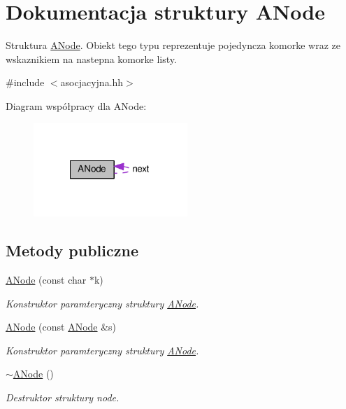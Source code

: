 \hypertarget{struct_a_node}{\section{Dokumentacja struktury A\-Node}
\label{struct_a_node}
}


Struktura \hyperlink{struct_a_node}{A\-Node}. Obiekt tego typu reprezentuje pojedyncza komorke wraz ze wskaznikiem na nastepna komorke listy.  




{\ttfamily \#include $<$asocjacyjna.\-hh$>$}



Diagram współpracy dla A\-Node\-:
\nopagebreak
\begin{figure}[H]
\begin{center}
\leavevmode
\includegraphics[width=165pt]{struct_a_node__coll__graph}
\end{center}
\end{figure}
\subsection*{Metody publiczne}
\begin{DoxyCompactItemize}
\item 
\hyperlink{struct_a_node_a932a13512cd7d15fe86c62b5292d66c1}{A\-Node} (const char $\ast$k)
\begin{DoxyCompactList}\small\item\em Konstruktor paramteryczny struktury \hyperlink{struct_a_node}{A\-Node}. \end{DoxyCompactList}\item 
\hyperlink{struct_a_node_a8f44e3ed23b669c075640f3c9976d9f5}{A\-Node} (const \hyperlink{struct_a_node}{A\-Node} \&s)
\begin{DoxyCompactList}\small\item\em Konstruktor paramteryczny struktury \hyperlink{struct_a_node}{A\-Node}. \end{DoxyCompactList}\item 
\hyperlink{struct_a_node_aec880ec60e95396aba5ffdc6ce0a4e8d}{$\sim$\-A\-Node} ()
\begin{DoxyCompactList}\small\item\em Destruktor struktury node. \end{DoxyCompactList}\end{DoxyCompactItemize}
